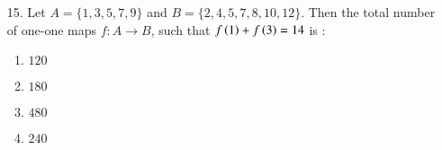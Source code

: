 \documentclass[journal,12pt,onecolumn]{IEEEtran}
\theoremstyle{remark}
\begin{document}
\begin{enumerate}
\begin{multicols}{4}
\begin{enumerate}
            \item $81$ \columnbreak
            \item $108$ \columnbreak
            \item $32$
		\end{enumerate}
	\end{multicols}
\item[15.] Let $A = \{ 1, 3, 5, 7, 9\}$ and $B = \{ 2, 4, 5, 7, 8, 10, 12 \}$. Then the total
    number of one-one maps $f : A \rightarrow B$, such that $f\left(1\right) + f\left(3\right) = 14$ is :
		\hfill{}
	\begin{multicols}{4}
		\begin{enumerate}
			\item $120$ \columnbreak
			\item $180$ \columnbreak
			\item $480$ \columnbreak
			\item $240$
		\end{enumerate}
	\end{multicols}
	\end{enumerate}
\end{document}

